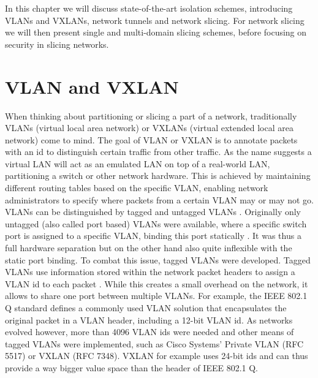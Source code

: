 

In this chapter we will discuss state-of-the-art isolation schemes, introducing VLANs and VXLANs, network tunnels and network slicing. For network slicing we will then present single and multi-domain slicing schemes, before focusing on security in slicing networks. %

\section{VLAN and VXLAN} When thinking about partitioning or slicing a part of a network, traditionally VLANs (virtual local area network) \cite{IEEE8021Q} or VXLANs (virtual extended local area network) \cite{rfc7348} come to mind. The goal of VLAN or VXLAN is to annotate packets with an id to distinguish certain traffic from other traffic. As the name suggests a virtual LAN will act as an emulated LAN on top of a real-world LAN, partitioning a switch or other network hardware. This is achieved by maintaining different routing tables based on the specific VLAN, enabling network administrators to specify where packets from a certain VLAN may or may not go. VLANs can be distinguished by tagged and untagged VLANs \cite[25.2]{IEEE8021Q}. Originally only untagged (also called port based) VLANs were available, where a specific switch port is assigned to a specific VLAN, binding this port statically \cite[25.3]{IEEE8021Q}. It was thus a full hardware separation but on the other hand also quite inflexible with the static port binding. To combat this issue, tagged VLANs were developed. Tagged VLANs use information stored within the network packet headers to assign a VLAN id to each packet \cite{IEEE8021Q}. While this creates a small overhead on the network, it allows to share one port between multiple VLANs. For example, the IEEE 802.1 Q standard defines a commonly used VLAN solution that encapsulates the original packet in a VLAN header, including a 12-bit VLAN id. As networks evolved however, more than 4096 VLAN ids were needed and other means of tagged VLANs were implemented, such as Cisco Systems' Private VLAN (RFC 5517) \cite{rfc5517} or VXLAN (RFC 7348). VXLAN for example uses 24-bit ids and can thus provide a way bigger value space than the header of IEEE 802.1 Q. 

